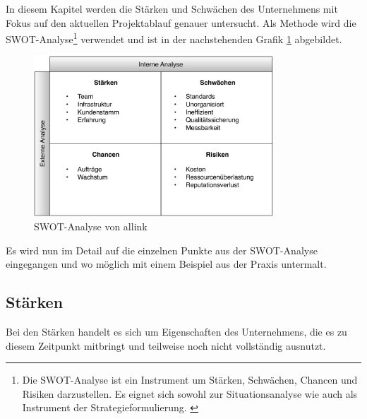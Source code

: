 In diesem Kapitel werden die Stärken und Schwächen des Unternehmens mit Fokus
auf den aktuellen Projektablauf genauer untersucht. Als Methode
wird die SWOT-Analyse\footnote{Die SWOT-Analyse ist ein Instrument um
Stärken, Schwächen, Chancen und Risiken darzustellen. Es eignet sich sowohl zur Situationsanalyse
wie auch als Instrument der Strategieformulierung. \citealp*[Vgl.][S. 134]{homburg2000quantitative}} 
verwendet und ist in der nachstehenden Grafik \ref{pic:swot_analyse} abgebildet.

\begin{figure}[htbp]
\begin{center}
\includegraphics[width=0.8\textwidth,angle=0]{./bilder/analyse/swot_analyse.pdf}
\caption[SWOT-Analyse von allink]{SWOT-Analyse von allink\footnotemark}
\label{pic:swot_analyse}
\end{center}
\end{figure}

Es wird nun im Detail auf die einzelnen Punkte aus der SWOT-Analyse eingegangen
und wo möglich mit einem Beispiel aus der Praxis untermalt.

% 

\subsection{Stärken}
Bei den Stärken handelt es sich um Eigenschaften des Unternehmens,
die es zu diesem Zeitpunkt mitbringt und teilweise noch nicht vollständig
ausnutzt. 

